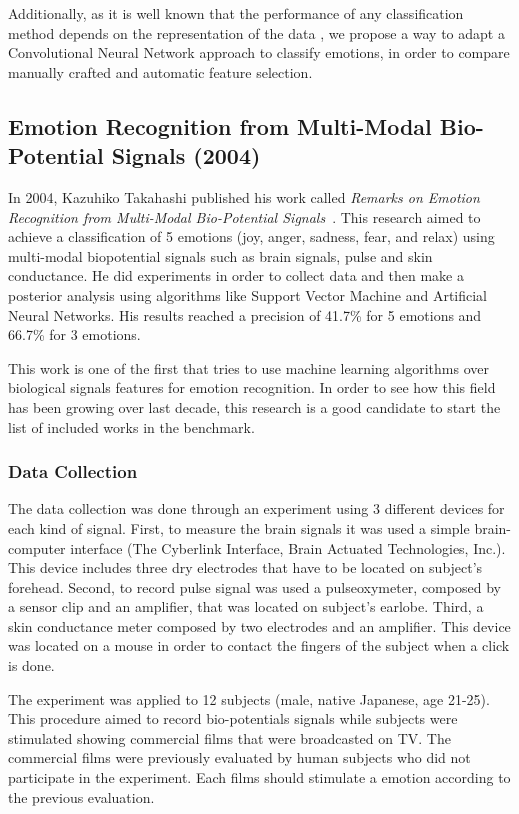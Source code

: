 \documentclass{sig-alternate}
\begin{document}
Additionally, as it is well known that the performance of any 
classification method depends on the representation of the data 
\cite{bengio2013representation}, 
we propose a way to adapt a Convolutional Neural 
Network approach to classify emotions, in order to compare  manually
crafted and automatic feature selection. 

\subsection{Emotion Recognition from Multi-Modal Bio-Potential Signals (2004)}	

In 2004, Kazuhiko Takahashi published his work called 
\textit{Remarks on Emotion Recognition from Multi-Modal Bio-Potential Signals}~\cite{takahashi2004}. This 
research aimed to achieve a classification of 5 emotions (joy, anger, sadness, fear, and relax)
using multi-modal biopotential signals such as brain signals, pulse and skin conductance. He
 did experiments in order to collect data and then make a posterior analysis using algorithms
 like Support Vector Machine and Artificial Neural Networks. His results reached a precision of
 41.7\% for 5 emotions and 66.7\% for 3 emotions. 

This work is one of the first that tries to use machine learning algorithms
 over biological signals features for emotion recognition. In order to see
 how this field has been growing over last decade, this research is a good
 candidate to start the list of included works in the benchmark.  

\subsubsection{Data Collection}

The data collection was done through an experiment using 3 different devices for each kind of signal. 
First, to measure the brain signals it was used a simple brain-computer interface
(The Cyberlink Interface, Brain Actuated Technologies, Inc.). This device includes 
three dry electrodes that have to be located on subject's forehead. Second, to record 
pulse signal was used a pulseoxymeter, composed by a sensor clip and an amplifier, that 
was located on subject's earlobe. Third, a skin conductance meter composed by
two electrodes and an amplifier. This device was located on a mouse in order to 
contact the fingers of the subject when a click is done. 

The experiment was applied to 12 subjects (male, native Japanese, age 21-25). This
procedure aimed to record bio-potentials signals while subjects were stimulated showing commercial 
films that were broadcasted on TV. The commercial films were previously evaluated by 
human subjects who did not participate in the experiment. Each films should stimulate a 
emotion according to the previous evaluation.         
\end{document}
